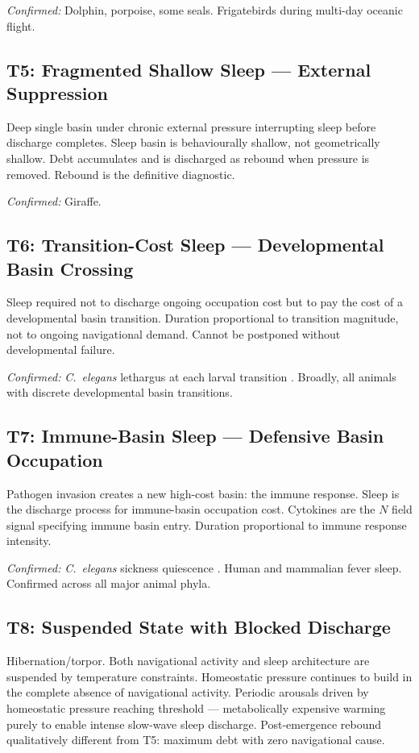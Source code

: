 \documentclass[10pt, a4paper]{article}
\begin{document}
\textit{Confirmed:} Dolphin, porpoise,
some seals. Frigatebirds during
multi-day oceanic flight.

\subsection{T5: Fragmented Shallow Sleep
--- External Suppression}

Deep single basin under chronic external
pressure interrupting sleep before
discharge completes. Sleep basin is
behaviourally shallow, not geometrically
shallow. Debt accumulates and is
discharged as rebound when pressure is
removed. Rebound is the definitive
diagnostic.

\textit{Confirmed:} Giraffe.

\subsection{T6: Transition-Cost Sleep ---
Developmental Basin Crossing}

Sleep required not to discharge ongoing
occupation cost but to pay the cost of
a developmental basin transition.
Duration proportional to transition
magnitude, not to ongoing navigational
demand. Cannot be postponed without
developmental failure.

\textit{Confirmed:} \textit{C.~elegans}
lethargus at each larval transition
\cite{allada2008invertebrate}. Broadly,
all animals with discrete developmental
basin transitions.

\subsection{T7: Immune-Basin Sleep ---
Defensive Basin Occupation}

Pathogen invasion creates a new
high-cost basin: the immune response.
Sleep is the discharge process for
immune-basin occupation cost. Cytokines
are the $N$ field signal specifying
immune basin entry. Duration proportional
to immune response intensity.

\textit{Confirmed:}
\textit{C.~elegans} sickness quiescence
\cite{hill2014cellular}. Human and
mammalian fever sleep. Confirmed across
all major animal phyla.

\subsection{T8: Suspended State with
Blocked Discharge}

Hibernation/torpor. Both navigational
activity and sleep architecture are
suspended by temperature constraints.
Homeostatic pressure continues to
build in the complete absence of
navigational activity. Periodic arousals
driven by homeostatic pressure reaching
threshold --- metabolically expensive
warming purely to enable intense
slow-wave sleep discharge. Post-emergence
rebound qualitatively different from T5:
maximum debt with zero navigational
cause.
\end{document}
